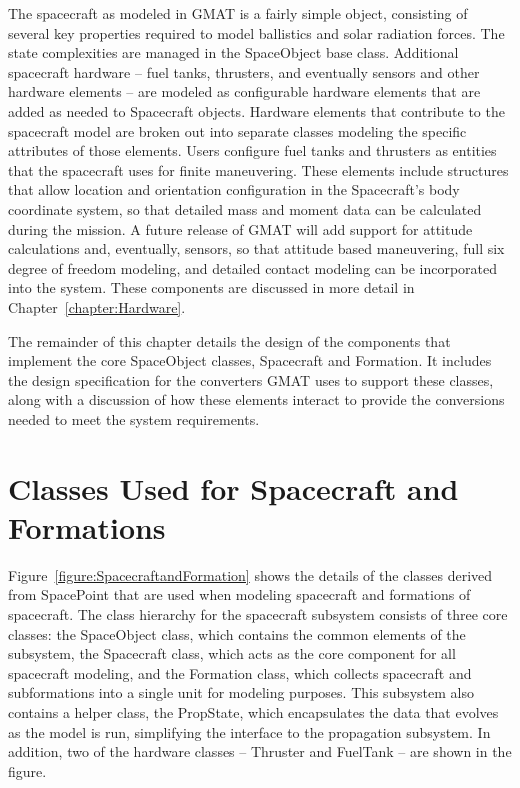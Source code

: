 The spacecraft as modeled in GMAT is a fairly simple object, consisting of several key properties
required to model ballistics and solar radiation forces.  The state complexities are managed in the
SpaceObject base class.  Additional spacecraft hardware -- fuel tanks, thrusters, and eventually
sensors and other hardware elements -- are modeled as configurable hardware elements that are added
as needed to Spacecraft objects.  Hardware elements that contribute to the spacecraft model are
broken out into separate classes modeling the specific attributes of those elements. Users configure
fuel tanks and thrusters as entities that the spacecraft uses for finite maneuvering.  These
elements include structures that allow location and orientation configuration in the Spacecraft's
body coordinate system, so that detailed mass and moment data can be calculated during the mission.
A future release of GMAT will add support for attitude calculations and, eventually, sensors, so
that attitude based maneuvering, full six degree of freedom modeling, and detailed contact modeling
can be incorporated into the system.   These components are discussed in more detail in
Chapter~\ref{chapter:Hardware}.

The remainder of this chapter details the design of the components that implement the core
SpaceObject classes, Spacecraft and Formation.  It includes the design specification for the
converters GMAT uses to support these classes, along with a discussion of how these elements
interact to provide the conversions needed to meet the system requirements.

\section{Classes Used for Spacecraft and Formations}

Figure~\ref{figure:SpacecraftandFormation} shows the details of the classes derived from SpacePoint
that are used when modeling spacecraft and formations of spacecraft.  The class hierarchy
for the spacecraft subsystem consists of three core classes: the SpaceObject class, which contains
the common elements of the subsystem, the Spacecraft class, which acts as the core component for all
spacecraft modeling, and the Formation class, which collects spacecraft and subformations into a
single unit for modeling purposes.  This subsystem also contains a helper class, the PropState,
which encapsulates the data that evolves as the model is run, simplifying the interface to the
propagation subsystem.  In addition, two of the hardware classes -- Thruster and FuelTank -- are
shown in the figure.

